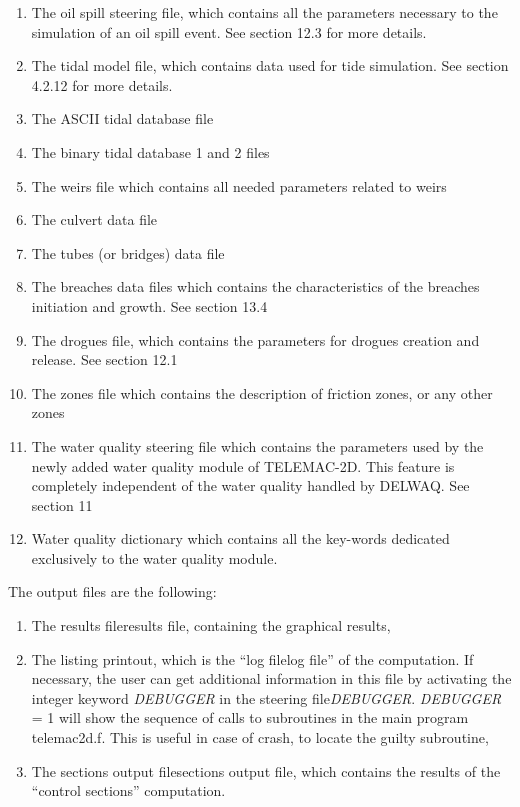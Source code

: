 \documentclass{article} %
\begin{document}
\begin{enumerate}
\item  The oil spill steering file, which contains all the parameters necessary to the simulation of an oil spill event.  See section 12.3 for more details.

\item  The tidal model file, which contains data used for tide simulation. See section 4.2.12 for more details.

\item  The ASCII tidal database file

\item  The binary tidal database 1 and 2 files

\item  The weirs file which contains all needed parameters related to weirs

\item  The culvert data file

\item  The tubes (or bridges) data file

\item  The breaches data files which contains the characteristics of the breaches initiation and growth. See section 13.4

\item  The drogues file, which contains the parameters for drogues creation and release. See section 12.1

\item  The zones file which contains the description of friction zones, or any other zones

\item  The water quality steering file which contains the parameters used by the newly added water quality module of TELEMAC-2D. This feature is completely independent of the water quality handled by DELWAQ. See section 11

\item  Water quality dictionary which contains all the key-words dedicated exclusively to the water quality module.
\end{enumerate}



 The output files are the following:

\begin{enumerate}
\item  The results fileresults file, containing the graphical results,

\item  The listing printout, which is the ``log filelog file'' of the computation. If necessary, the user can get additional information in this file by activating the integer keyword \textit{DEBUGGER} in the steering file\textit{DEBUGGER}. \textit{DEBUGGER} = 1 will show the sequence of calls to subroutines in the main program telemac2d.f. This is useful in case of crash, to locate the guilty subroutine,

\item  The sections output filesections output file, which contains the results of the ``control sections'' computation.
\end{enumerate}
\end{document}
